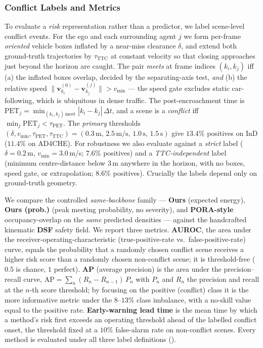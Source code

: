\documentclass[journal]{IEEEtran}
\begin{document}
\subsubsection{Conflict Labels and Metrics}\label{sec:results_metrics}
To evaluate a \emph{risk} representation rather than a predictor, we label scene-level conflict events. For the ego and each surrounding agent $j$ we form per-frame \emph{oriented} vehicle boxes inflated by a near-miss clearance $\delta$, and extend both ground-truth trajectories by $\tau_{\mathrm{TTC}}$ at constant velocity so that closing approaches just beyond the horizon are caught. The pair \emph{meets} at frame indices $(k_i,k_j)$ iff (a) the inflated boxes overlap, decided by the separating-axis test, \emph{and} (b) the relative speed $\lVert\mathbf{v}^{(0)}_{k_i}-\mathbf{v}^{(j)}_{k_j}\rVert>v_{\min}$ --- the speed gate excludes static car-following, which is ubiquitous in dense traffic. The post-encroachment time is $\mathrm{PET}_j=\min_{(k_i,k_j)\,\mathrm{meet}}|k_i-k_j|\,\Delta t$, and a scene is a \emph{conflict} iff $\min_j \mathrm{PET}_j<\tau_{\mathrm{PET}}$. The \emph{primary} thresholds $(\delta,v_{\min},\tau_{\mathrm{PET}},\tau_{\mathrm{TTC}})=(0.3\,\mathrm{m},\,2.5\,\mathrm{m/s},\,1.0\,\mathrm{s},\,1.5\,\mathrm{s})$ give $13.4\%$ positives on InD ($11.4\%$ on AD4CHE). For robustness we also evaluate against a \emph{strict} label ($\delta{=}0.2$\,m, $v_{\min}{=}3.0$\,m/s; $7.6\%$ positives) and a \emph{TTC-independent} label (minimum centre-distance below $3$\,m anywhere in the horizon, with no boxes, speed gate, or extrapolation; $8.6\%$ positives). Crucially the labels depend only on ground-truth geometry. 

We compare the controlled \emph{same-backbone} family --- \textbf{Ours} (expected energy), \textbf{Ours (prob.)} (peak meeting probability, no severity), and \textbf{PORA-style} occupancy-overlap on the \emph{same} predicted densities \cite{wang2025dynamic} --- against the handcrafted kinematic \textbf{DSF} safety field. We report three metrics. \textbf{AUROC}, the area under the receiver-operating-characteristic (true-positive-rate vs.\ false-positive-rate) curve, equals the probability that a randomly chosen conflict scene receives a higher risk score than a randomly chosen non-conflict scene; it is threshold-free ($0.5$ is chance, $1$ perfect). \textbf{AP} (average precision) is the area under the precision--recall curve, $\mathrm{AP}=\sum_n (R_n-R_{n-1})\,P_n$ with $P_n$ and $R_n$ the precision and recall at the $n$-th score threshold; by focusing on the positive (conflict) class it is the more informative metric under the $8$--$13\%$ class imbalance, with a no-skill value equal to the positive rate. \textbf{Early-warning lead time} is the mean time by which a method's risk first exceeds an operating threshold ahead of the labelled conflict onset, the threshold fixed at a $10\%$ false-alarm rate on non-conflict scenes. Every method is evaluated under all three label definitions ().
\end{document}
